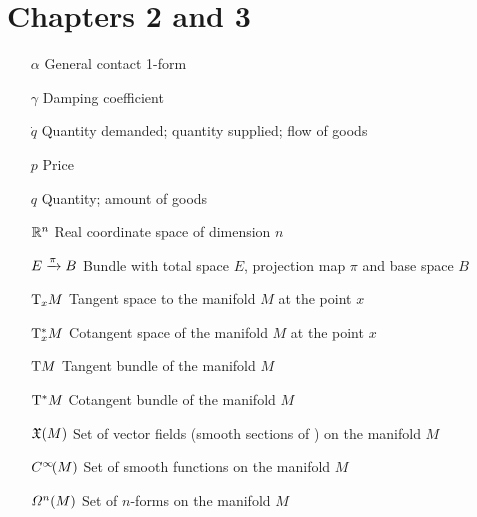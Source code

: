 \section*{Chapters 2 and 3}
\begin{itemize}[itemsep=0pt, leftmargin=2cm, labelsep=0cm, labelwidth=1.9cm, align=left]
    \item[$\alpha$] General contact 1-form
    \item[$\gamma$] Damping coefficient
%
    \item[$\dot{q}$] Quantity demanded; quantity supplied; flow of goods
    \item[$p$] Price
    \item[$q$] Quantity; amount of goods
%
    \item[$\mathbb{R}^n$] Real coordinate space of dimension $n$
%
%
    \item[$E\xrightarrow[]{\pi}B$]  Bundle with total space $E$, projection map $\pi$ and base space $B$
    \item[$\mathrm{T}_{x} M$]  Tangent space to the manifold $M$ at the point $x$
    \item[$\mathrm{T}_{x}^*M$]  Cotangent space of the manifold $M$ at the point $x$
    \item[$\mathrm{T}M$]  Tangent bundle of the manifold $M$
    \item[$\mathrm{T}^*M$]  Cotangent bundle of the manifold $M$
    \item[$\mathfrak{X}\qty(M)$]  Set of vector fields (smooth sections of ) on the manifold $M$
    \item[$C^\infty\!\qty(M)$]  Set of smooth functions on the manifold $M$
    \item[$\Omega^{n}(M)$]  Set of $n$-forms on the manifold $M$
\end{itemize}